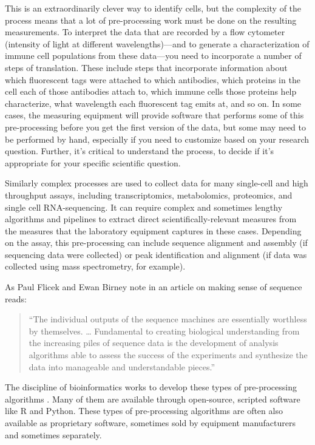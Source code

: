 \documentclass[]{tufte-book}
\begin{document}
This is an extraordinarily clever way to identify cells, but the complexity of
the process means that a lot of pre-processing work must be done on the resulting
measurements. To interpret the data that are recorded by a flow cytometer
(intensity of light at different wavelengths)---and to generate a
characterization of immune cell populations from these data---you need to
incorporate a number of steps of translation. These include steps that
incorporate information about which fluorescent tags were attached to which
antibodies, which proteins in the cell each of those antibodies attach to, which
immune cells those proteins help characterize, what wavelength each fluorescent
tag emits at, and so on. In some cases, the measuring equipment will provide
software that performs some of this pre-processing before you get the first
version of the data, but some may need to be performed by hand, especially if
you need to customize based on your research question. Further, it's critical to
understand the process, to decide if it's appropriate for your specific
scientific question.

Similarly complex processes are used to collect data for many single-cell and
high throughput assays, including transcriptomics, metabolomics, proteomics,
and single cell RNA-sequencing. It can require complex and sometimes lengthy
algorithms and pipelines to extract direct scientifically-relevant measures
from the measures that the laboratory equipment captures in these cases.
Depending on the assay, this pre-processing can include sequence alignment
and assembly (if sequencing data were collected) or peak identification and
alignment (if data was collected using mass spectrometry, for example).

As Paul Flicek and Ewan Birney note in an article on making sense of
sequence reads:

\begin{quote}
``The individual outputs of the sequence machines are essentially worthless by
themselves. \ldots{} Fundamental to creating biological understanding from the
increasing piles of sequence data is the development of analysis algorithms able
to assess the success of the experiments and synthesize the data into manageable
and understandable pieces.'' \citep{flicek2009sense}
\end{quote}

The discipline of bioinformatics works to develop these types of pre-processing
algorithms \citep{barry2009new}. Many of them are available through open-source,
scripted software like R and Python. These types of pre-processing algorithms
are often also available as proprietary software, sometimes sold by equipment
manufacturers and sometimes separately.
\end{document}
